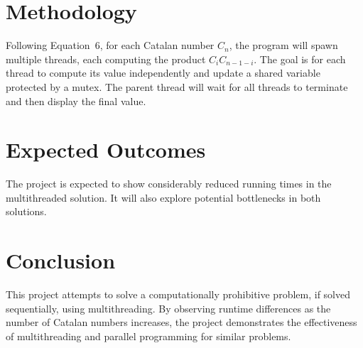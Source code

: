 \documentclass[11pt]{article}
\begin{document}
\section{Methodology}
Following Equation~6, for each Catalan number $C_n$, the program will spawn multiple threads, each computing the product $C_i C_{n-1-i}$. The goal is for each thread to compute its value independently and update a shared variable protected by a mutex. The parent thread will wait for all threads to terminate and then display the final value.

\section{Expected Outcomes}
The project is expected to show considerably reduced running times in the multithreaded solution. It will also explore potential bottlenecks in both solutions.

\section{Conclusion}
This project attempts to solve a computationally prohibitive problem, if solved sequentially, using multithreading. By observing runtime differences as the number of Catalan numbers increases, the project demonstrates the effectiveness of multithreading and parallel programming for similar problems.


\end{document}
